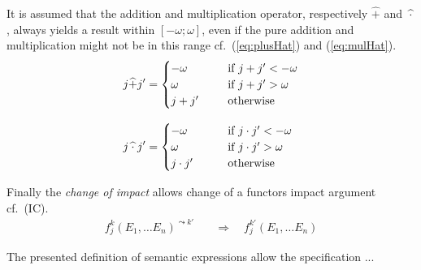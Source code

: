 \begin{definition}
It is assumed that the addition and multiplication operator, respectively $\widehat{+}$ and $\widehat{\hspace{2.5pt} \cdot \hspace{2.5pt} }$, always yields a result within $[-\omega;\omega]$, even if the pure addition and multiplication might not be in this range cf.\ (\ref{eq:plusHat}) and (\ref{eq:mulHat}).
\begin{align}
    j \widehat{+} j' &= 
\begin{cases}
    -\omega        & \text{if } j + j' < -\omega\\    
    \omega         & \text{if } j + j' > \omega \\
    \makebox[40pt][l]{$j + j'$}         & \text{otherwise}
\end{cases}
\label{eq:plusHat}
\\[.8em]
    j \widehat{\hspace{2.5pt} \cdot \hspace{2.5pt}} j' &= 
\begin{cases}
    -\omega        & \text{if } j \cdot j' < -\omega\\    
    \omega         & \text{if } j \cdot j' > \omega \\
    \makebox[40pt][l]{$j \cdot j'$}         & \text{otherwise}
\end{cases}
\label{eq:mulHat}
\end{align}

Finally the \emph{change of impact} allows change of a functors impact argument cf.\ (IC).
\begin{align}
f_j^k(E_1, \ldots E_n)^{\leadsto k'} &\quad \Rightarrow \quad f_j^{k'}(E_1, \ldots E_n)
 \tag{IC} 
\end{align}

\label{def:semanticExpressions}
\done
\end{definition}

The presented definition of semantic expressions allow the specification ...


